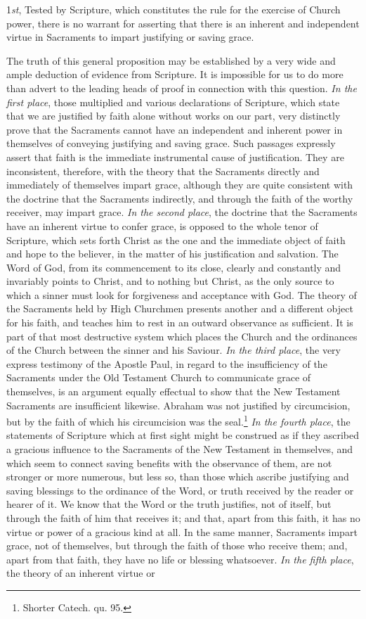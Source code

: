 \documentclass[]{book}
\begin{document}
1\emph{st}, Tested by Scripture, which constitutes the rule for the exercise of Church power, there is no warrant for asserting that there is an inherent and independent virtue in Sacraments to impart justifying or saving grace.

The truth of this general proposition may be established by a very wide and ample deduction of evidence from Scripture. It is impossible for us to do more than advert to the leading heads of proof in connection with this question. \emph{In the first place}, those multiplied and various declarations of Scripture, which state that we are justified by faith alone without works on our part, very distinctly prove that the Sacraments cannot have an independent and inherent power in themselves of conveying justifying and saving grace. Such passages expressly assert that faith is the immediate instrumental cause of justification. They are inconsistent, therefore, with the theory that the Sacraments directly and immediately of themselves impart grace, although they are quite consistent with the doctrine that the Sacraments indirectly, and through the faith of the worthy receiver, may impart grace. \emph{In the second place}, the doctrine that the Sacraments have an inherent virtue to confer grace, is opposed to the whole tenor of Scripture, which sets forth Christ as the one and the immediate object of faith and hope to the believer, in the matter of his justification and salvation. The Word of God, from its commencement to its close, clearly and constantly and invariably points to Christ, and to nothing but Christ, as the only source to which a sinner must look for forgiveness and acceptance with God. The theory of the Sacraments held by High Churchmen presents another and a different object for his faith, and teaches him to rest in an outward observance as sufficient. It is part of that most destructive system which places the Church and the ordinances of the Church between the sinner and his Saviour. \emph{In the third place}, the very express testimony of the Apostle Paul, in regard to the insufficiency of the Sacraments under the Old Testament Church to communicate grace of themselves, is an argument equally effectual to show that the New Testament Sacraments are insufficient likewise. Abraham was not justified by circumcision, but by the faith of which his circumcision was the seal.\footnote{Shorter Catech. qu. 95.} \emph{In the fourth place}, the statements of Scripture which at first sight might be construed as if they ascribed a gracious influence to the Sacraments of the New Testament in themselves, and which seem to connect saving benefits with the observance of them, are not stronger or more numerous, but less so, than those which ascribe justifying and saving blessings to the ordinance of the Word, or truth received by the reader or hearer of it. We know that the Word or the truth justifies, not of itself, but through the faith of him that receives it; and that, apart from this faith, it has no virtue or power of a gracious kind at all. In the same manner, Sacraments impart grace, not of themselves, but through the faith of those who receive them; and, apart from that faith, they have no life or blessing whatsoever. \emph{In the fifth place}, the theory of an inherent virtue or 
\end{document}

